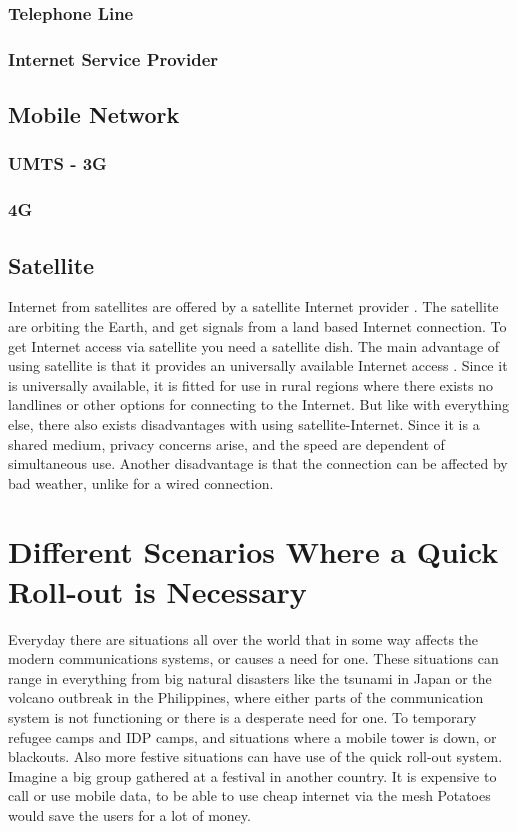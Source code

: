 \subsubsection{Telephone Line}
\subsubsection{Internet Service Provider}

\subsection{Mobile Network}
\subsubsection{UMTS - 3G}
\subsubsection{4G}

\subsection{Satellite}

Internet from satellites are offered by a satellite Internet provider \cite{cablevssatellite}. The satellite are orbiting the Earth, and get signals from a land based Internet connection. To get Internet access via satellite you need a satellite dish. The main advantage of using satellite is that it provides an universally available Internet access \cite{broadband}. Since it is universally available, it is fitted for use in rural regions where there exists no landlines or other options for connecting to the Internet. But like with everything else, there also exists disadvantages with using satellite-Internet. Since it is a shared medium, privacy concerns arise, and the speed are dependent of simultaneous use. Another disadvantage is that the connection can be affected by bad weather, unlike for a wired connection.

\section{Different Scenarios Where a Quick Roll-out is Necessary}
Everyday there are situations all over the world that in some way affects the modern communications systems, or causes a need for one. These situations can range in everything from big natural disasters like the tsunami in Japan or the volcano outbreak in the Philippines, where either parts of the communication system is not functioning or there is a desperate need for one. To temporary refugee camps and IDP camps, and situations where a mobile tower is down, or blackouts. Also more festive situations can have use of the quick roll-out system. Imagine a big group gathered at a festival in another country. It is expensive to call or use mobile data, to be able to use cheap internet via the mesh Potatoes would save the users for a lot of money. 

